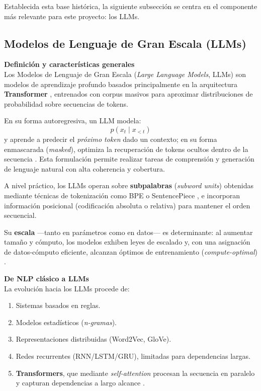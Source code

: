 Establecida esta base histórica, la siguiente subsección se centra en el componente más relevante para este proyecto: los LLMs.
\newpage

\subsection{Modelos de Lenguaje de Gran Escala (LLMs)}

\textbf{Definición y características generales} \\
Los Modelos de Lenguaje de Gran Escala (\textit{Large Language Models}, LLMs) son modelos de aprendizaje profundo basados principalmente en la arquitectura \textbf{Transformer} \cite{Vaswani2017}, entrenados con corpus masivos para aproximar distribuciones de probabilidad sobre secuencias de tokens.  

En su forma autoregresiva, un LLM modela:
\[
p(x_t \mid x_{<t}) 
\]
y aprende a predecir el \textit{próximo token} dado un contexto; en su forma enmascarada (\textit{masked}), optimiza la recuperación de tokens ocultos dentro de la secuencia \cite{Devlin2018}. Esta formulación permite realizar tareas de comprensión y generación de lenguaje natural con alta coherencia y cobertura.

A nivel práctico, los LLMs operan sobre \textbf{subpalabras} (\textit{subword units}) obtenidas mediante técnicas de tokenización como BPE o SentencePiece \cite{Sennrich2016,Kudo2018}, e incorporan información posicional (codificación absoluta o relativa) para mantener el orden secuencial.  

Su \textbf{escala} —tanto en parámetros como en datos— es determinante: al aumentar tamaño y cómputo, los modelos exhiben leyes de escalado \cite{Kaplan2020} y, con una asignación de datos-cómputo eficiente, alcanzan óptimos de entrenamiento (\textit{compute-optimal}) \cite{Hoffmann2022}.

\vspace{0.3cm}
\textbf{De NLP clásico a LLMs} \\
La evolución hacia los LLMs procede de:
\begin{enumerate}
    \item Sistemas basados en reglas.
    \item Modelos estadísticos (\textit{n-gramas}).
    \item Representaciones distribuidas (Word2Vec, GloVe).
    \item Redes recurrentes (RNN/LSTM/GRU), limitadas para dependencias largas.
    \item \textbf{Transformers}, que mediante \textit{self-attention} procesan la secuencia en paralelo y capturan dependencias a largo alcance \cite{Vaswani2017}.
\end{enumerate}

